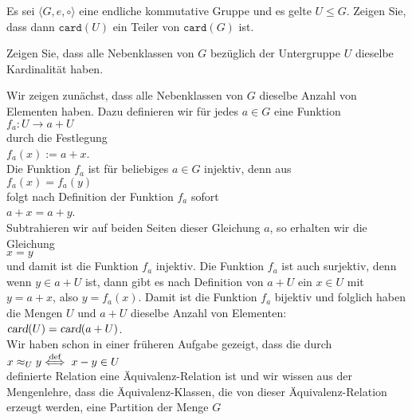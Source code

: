 \exerciseStar
Es sei $\langle G, e, \circ \rangle$ eine endliche kommutative Gruppe und es gelte $U \leq G$.
Zeigen Sie, dass dann $\mathtt{card}(U)$ ein Teiler von $\mathtt{card}(G)$ ist. 

\hint
Zeigen Sie, dass alle Nebenklassen von $G$ bez\"{u}glich der Untergruppe $U$ dieselbe
Kardinalit\"{a}t haben.
\eoxs

\solution
Wir zeigen zun\"{a}chst, dass alle Nebenklassen von $G$ dieselbe Anzahl von Elementen haben.  Dazu
definieren wir f\"{u}r jedes $a \in G$ eine Funktion
\\[0.2cm]
\hspace*{1.3cm}
$f_a:U \rightarrow a + U$
\\[0.2cm]
durch die Festlegung
\\[0.2cm]
\hspace*{1.3cm}
$f_a(x) := a + x$.
\\[0.2cm]
Die Funktion $f_a$ ist f\"{u}r beliebiges $a \in G$ injektiv, denn aus
\\[0.2cm]
\hspace*{1.3cm}
$f_a(x) = f_a(y)$
\\[0.2cm]
folgt nach Definition der Funktion $f_a$ sofort
\\[0.2cm]
\hspace*{1.3cm}
$a + x = a + y$.
\\[0.2cm]
Subtrahieren wir auf beiden Seiten dieser Gleichung $a$, so erhalten wir die Gleichung
\\[0.2cm]
\hspace*{1.3cm}
$x = y$
\\[0.2cm]
und damit ist die Funktion $f_a$ injektiv.  Die Funktion $f_a$ ist auch surjektiv, denn wenn 
$y \in a + U$ ist, dann gibt es nach Definition von $a + U$ ein $x \in U$ mit $y = a + x$, also
$y = f_a(x)$.  Damit ist die Funktion $f_a$ bijektiv und folglich haben die Mengen $U$ und $a+U$
dieselbe Anzahl von Elementen:
\\[0.2cm]
\hspace*{1.3cm}
$\textsl{card}(U) = \textsl{card}(a + U)$.
\\[0.2cm]
Wir haben schon in einer fr\"{u}heren Aufgabe gezeigt, dass die durch
\\[0.2cm]
\hspace*{1.3cm}
$x \approx_U y \stackrel{\mbox{\scriptsize def}}{\Longleftrightarrow}\; x -y \in U$
\\[0.2cm]
definierte Relation eine \"{A}quivalenz-Relation ist und wir wissen aus der Mengenlehre, dass die
\"{A}quivalenz-Klassen, die von dieser \"{A}quivalenz-Relation erzeugt werden, eine Partition der Menge $G$
